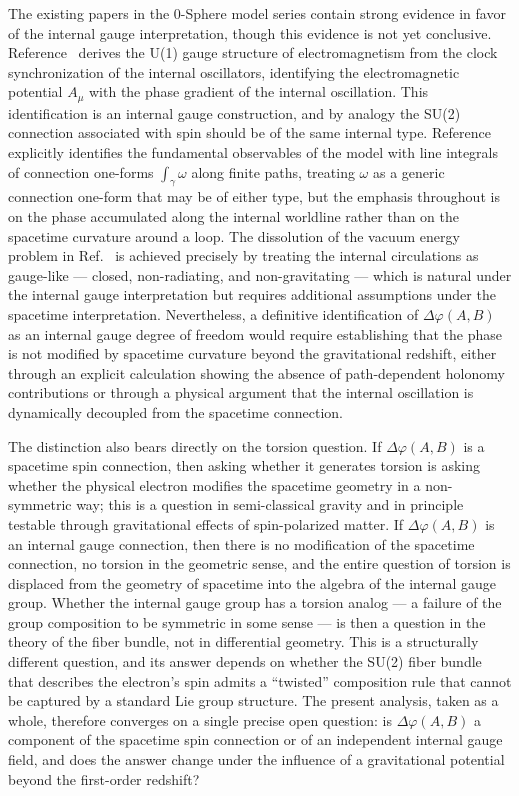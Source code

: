 \documentclass[%
 reprint,
 amsmath,amssymb,
 aps,
 prb,
]{revtex4-2}
\numberwithin{equation}{section}
\begin{document}
The existing papers in the 0-Sphere model series contain strong evidence in favor of the internal gauge interpretation, though this evidence is not yet conclusive. Reference~\cite{paper17} derives the U(1) gauge structure of electromagnetism from the clock synchronization of the internal oscillators, identifying the electromagnetic potential $A_\mu$ with the phase gradient of the internal oscillation. This identification is an internal gauge construction, and by analogy the SU(2) connection associated with spin should be of the same internal type. Reference~\cite{paper40} explicitly identifies the fundamental observables of the model with line integrals of connection one-forms $\int_\gamma \omega$ along finite paths, treating $\omega$ as a generic connection one-form that may be of either type, but the emphasis throughout is on the phase accumulated along the internal worldline rather than on the spacetime curvature around a loop. The dissolution of the vacuum energy problem in Ref.~\cite{paper32} is achieved precisely by treating the internal circulations as gauge-like --- closed, non-radiating, and non-gravitating --- which is natural under the internal gauge interpretation but requires additional assumptions under the spacetime interpretation. Nevertheless, a definitive identification of $\Delta\varphi(A,B)$ as an internal gauge degree of freedom would require establishing that the phase is not modified by spacetime curvature beyond the gravitational redshift, either through an explicit calculation showing the absence of path-dependent holonomy contributions or through a physical argument that the internal oscillation is dynamically decoupled from the spacetime connection.

The distinction also bears directly on the torsion question. If $\Delta\varphi(A,B)$ is a spacetime spin connection, then asking whether it generates torsion is asking whether the physical electron modifies the spacetime geometry in a non-symmetric way; this is a question in semi-classical gravity and in principle testable through gravitational effects of spin-polarized matter. If $\Delta\varphi(A,B)$ is an internal gauge connection, then there is no modification of the spacetime connection, no torsion in the geometric sense, and the entire question of torsion is displaced from the geometry of spacetime into the algebra of the internal gauge group. Whether the internal gauge group has a torsion analog --- a failure of the group composition to be symmetric in some sense --- is then a question in the theory of the fiber bundle, not in differential geometry. This is a structurally different question, and its answer depends on whether the SU(2) fiber bundle that describes the electron's spin admits a ``twisted'' composition rule that cannot be captured by a standard Lie group structure. The present analysis, taken as a whole, therefore converges on a single precise open question: is $\Delta\varphi(A,B)$ a component of the spacetime spin connection or of an independent internal gauge field, and does the answer change under the influence of a gravitational potential beyond the first-order redshift?
\end{document}
